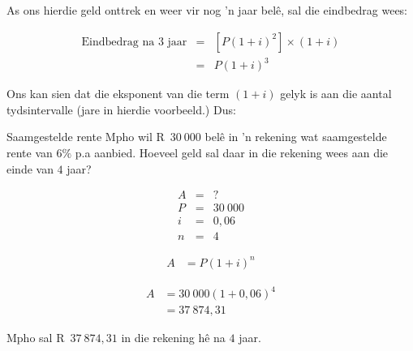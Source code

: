 As ons hierdie geld onttrek en weer vir nog ’n jaar belê, sal die eindbedrag wees:

\begin{eqnarray*}
    \mbox{Eindbedrag na 3 jaar} &=& [P(1 + i)^2] \times (1 + i)\\
    &=& P(1 + i)^3
\end{eqnarray*}

Ons kan sien dat die eksponent van die term $(1 + i)$ gelyk is aan die aantal tydsintervalle (jare in hierdie voorbeeld.) Dus:




\begin{wex}{Saamgestelde rente}{
    Mpho wil R~$30~000$ bel\^e in 'n rekening wat saamgestelde rente van $6\%$ p.a aanbied. Hoeveel geld sal daar in die rekening wees aan die einde van $4$ jaar?}{
    
    \begin{eqnarray*}
	A &=& ?\\
	P &=& 30~000\\
	i &=& 0,06\\
	n &=& 4
    \end{eqnarray*}

    \begin{align*}
	A &= P(1 + i)^n
    \end{align*}

    \begin{align*}
	A &= 30~000(1 + 0,06)^4\\
	  &= 37~874,31
    \end{align*}

    Mpho sal R~$37~874,31$ in die rekening h\^e na $4$ jaar.
    }
\end{wex}


